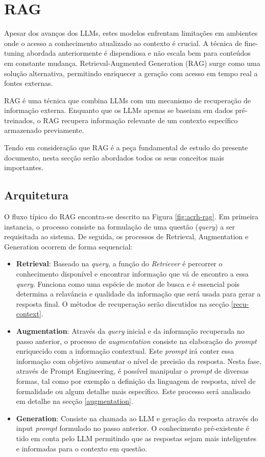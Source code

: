 \section{RAG}


Apesar dos avanços dos LLMs, estes modelos enfrentam limitações em ambientes onde o acesso a conhecimento atualizado ao contexto é crucial. A técnica de fine-tuning abordada anteriormente é dispendiosa e não escala bem para conteúdos em constante mudança. Retrieval-Augmented Generation (RAG) surge como uma solução alternativa, permitindo enriquecer a geração com acesso em tempo real a fontes externas.

RAG é uma técnica que combina LLMs com um mecanismo de recuperação de informação externa. Enquanto que os LLMs apenas se baseiam em dados pré-treinados, o RAG recupera informação relevante de um contexto específico armazenado previamente.

Tendo em consideração que RAG é a peça fundamental de estudo do presente documento, nesta secção serão abordados todos os seus conceitos mais importantes.

\subsection{Arquitetura}


O fluxo típico do RAG encontra-se descrito na Figura \ref{fig:acrh-rag}. Em primeira instancia, o processo consiste na formulação de uma questão (\textit{query}) a ser requisitada ao sistema. De seguida, os processos de  Retrieval, Augmentation e Generation ocorrem de forma sequencial: 


\begin{itemize}
    \item \textbf{Retrieval}: Baseado na \textit{query}, a função do \textit{Retriever} é percorrer o conhecimento disponível e encontrar informação que vá de encontro a essa \textit{query}. Funciona como uma espécie de motor de busca e é essencial pois determina a relavância e qualidade da informação que será usada para gerar a resposta final. O métodos de recuperação serão discutidos na secção \ref{recu-context}.
    \item \textbf{Augmentation}: Através da \textit{query} inicial e da informação recuperada no passo anterior, o processo de \textit{augmentation} consiste na elaboração do \textit{prompt} enriquecido com a informação contextual. Este \textit{prompt} irá conter essa informação com objetivo aumentar o nível de precisão da resposta. Nesta fase, através de Prompt Engineering, é possível manipular o \textit{prompt} de diversas formas, tal como por exemplo a definição da linguagem de resposta, nivel de formalidade ou algum detalhe mais específico. Este processo será analisado em detalhe na secção \ref{augmentation}.
    \item \textbf{Generation}: Consiste na chamada ao LLM e geração da resposta através do input \textit{prompt} formulado no passo anterior. O conhecimento pré-existente é tido em conta pelo LLM permitindo que as respostas sejam mais inteligentes e informadas para o contexto em questão. 
\end{itemize}



